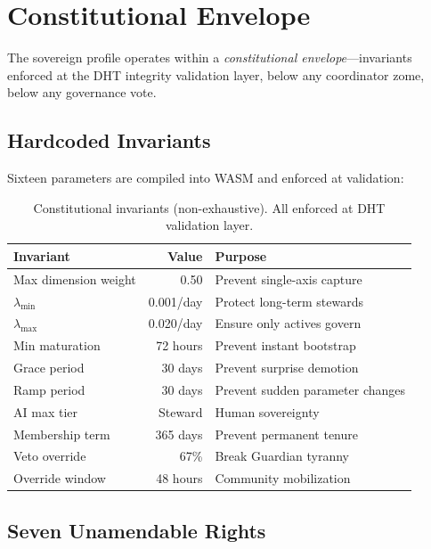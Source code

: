 \documentclass[11pt,twocolumn]{article}
\begin{document}
\section{Constitutional Envelope}
\label{sec:constitution}

The sovereign profile operates within a \emph{constitutional envelope}---invariants enforced at the DHT integrity validation layer, below any coordinator zome, below any governance vote.

\subsection{Hardcoded Invariants}

Sixteen parameters are compiled into WASM and enforced at validation:

\begin{table}[H]
\centering
\caption{Constitutional invariants (non-exhaustive). All enforced at DHT validation layer.}
\label{tab:invariants}
\begin{tabular}{lrl}
\toprule
\textbf{Invariant} & \textbf{Value} & \textbf{Purpose} \\
\midrule
Max dimension weight & 0.50 & Prevent single-axis capture \\
$\lambda_{\min}$ & 0.001/day & Protect long-term stewards \\
$\lambda_{\max}$ & 0.020/day & Ensure only actives govern \\
Min maturation & 72 hours & Prevent instant bootstrap \\
Grace period & 30 days & Prevent surprise demotion \\
Ramp period & 30 days & Prevent sudden parameter changes \\
AI max tier & Steward & Human sovereignty \\
Membership term & 365 days & Prevent permanent tenure \\
Veto override & 67\% & Break Guardian tyranny \\
Override window & 48 hours & Community mobilization \\
\bottomrule
\end{tabular}
\end{table}

\subsection{Seven Unamendable Rights}
\end{document}
